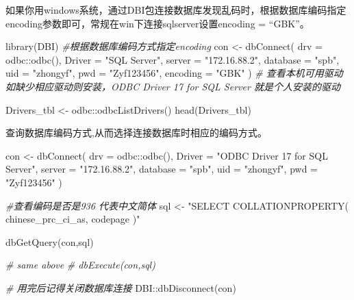 \documentclass[
]{book}
\newenvironment{Shaded}{\begin{snugshade}}{\end{snugshade}}
\newcommand{\AttributeTok}[1]{\textcolor[rgb]{0.77,0.63,0.00}{#1}}
\newcommand{\CommentTok}[1]{\textcolor[rgb]{0.56,0.35,0.01}{\textit{#1}}}
\newcommand{\FunctionTok}[1]{\textcolor[rgb]{0.00,0.00,0.00}{#1}}
\newcommand{\NormalTok}[1]{#1}
\newcommand{\OtherTok}[1]{\textcolor[rgb]{0.56,0.35,0.01}{#1}}
\newcommand{\SpecialCharTok}[1]{\textcolor[rgb]{0.00,0.00,0.00}{#1}}
\newcommand{\StringTok}[1]{\textcolor[rgb]{0.31,0.60,0.02}{#1}}
\begin{document}
如果你用windows系统，通过DBI包连接数据库发现乱码时，根据数据库编码指定encoding参数即可，常规在win下连接sqlserver设置encoding = ``GBK''。

\begin{Shaded}
\begin{Highlighting}[]
\FunctionTok{library}\NormalTok{(DBI)}
\CommentTok{\#根据数据库编码方式指定encoding}
\NormalTok{con }\OtherTok{\textless{}{-}} \FunctionTok{dbConnect}\NormalTok{(}
  \AttributeTok{drv =}\NormalTok{ odbc}\SpecialCharTok{::}\FunctionTok{odbc}\NormalTok{(), }\AttributeTok{Driver =} \StringTok{"SQL Server"}\NormalTok{, }\AttributeTok{server =} \StringTok{"172.16.88.2"}\NormalTok{,}
  \AttributeTok{database =} \StringTok{"spb"}\NormalTok{, }\AttributeTok{uid =} \StringTok{"zhongyf"}\NormalTok{, }\AttributeTok{pwd =} \StringTok{"Zyf123456"}\NormalTok{, }\AttributeTok{encoding =} \StringTok{"GBK"}
\NormalTok{)}
\CommentTok{\# 查看本机可用驱动 如缺少相应驱动则安装，ODBC Driver 17 for SQL Server 就是个人安装的驱动}

\NormalTok{Drivers\_tbl }\OtherTok{\textless{}{-}}\NormalTok{ odbc}\SpecialCharTok{::}\FunctionTok{odbcListDrivers}\NormalTok{() }
\FunctionTok{head}\NormalTok{(Drivers\_tbl)}
\end{Highlighting}
\end{Shaded}

查询数据库编码方式,从而选择连接数据库时相应的编码方式。

\begin{Shaded}
\begin{Highlighting}[]
\NormalTok{con }\OtherTok{\textless{}{-}} \FunctionTok{dbConnect}\NormalTok{(}
  \AttributeTok{drv =}\NormalTok{ odbc}\SpecialCharTok{::}\FunctionTok{odbc}\NormalTok{(), }\AttributeTok{Driver =} \StringTok{"ODBC Driver 17 for SQL Server"}\NormalTok{,}
  \AttributeTok{server =} \StringTok{"172.16.88.2"}\NormalTok{, }\AttributeTok{database =} \StringTok{"spb"}\NormalTok{, }\AttributeTok{uid =} \StringTok{"zhongyf"}\NormalTok{, }\AttributeTok{pwd =} \StringTok{"Zyf123456"}
\NormalTok{)}

\CommentTok{\#查看编码是否是936 代表中文简体}
\NormalTok{sql }\OtherTok{\textless{}{-}} \StringTok{"SELECT COLLATIONPROPERTY( \textquotesingle{}chinese\_prc\_ci\_as\textquotesingle{}, \textquotesingle{}codepage\textquotesingle{} )"}

\FunctionTok{dbGetQuery}\NormalTok{(con,sql)}

\CommentTok{\# same above}
\CommentTok{\# dbExecute(con,sql)}

\CommentTok{\# 用完后记得关闭数据库连接}
\NormalTok{DBI}\SpecialCharTok{::}\FunctionTok{dbDisconnect}\NormalTok{(con)}
\end{Highlighting}
\end{Shaded}
\end{document}
